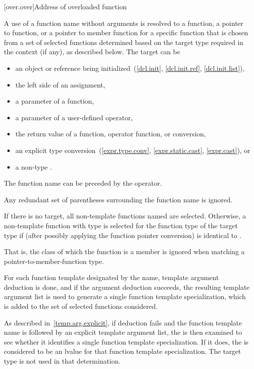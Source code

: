 %

[over.over]{Address of overloaded function}%
%

\pnum
A use of a function name without arguments is resolved to
a function, a pointer to function, or a pointer to member function
for a specific function
that is chosen from a set of selected functions
determined based on the target type required in the context (if any),
as described below.
The target can be
\begin{itemize}
\item
an object or reference being initialized~(\ref{dcl.init}, \ref{dcl.init.ref},
\ref{dcl.init.list}),
\item
the left side of an assignment,
\item
a parameter of a function,
\item
a parameter of a user-defined operator,
\item
the return value of a function, operator function, or conversion,
\item
an explicit type conversion~(\ref{expr.type.conv}, \ref{expr.static.cast},
\ref{expr.cast}), or
\item
a non-type
.
\end{itemize}
The function name can be preceded by the \tcode{\&} operator.
\begin{note}
Any redundant set of parentheses surrounding the function name is
ignored.
\end{note}

\pnum
If there is no target, all non-template functions named are selected.
Otherwise, a non-template function with type 
is selected for the function type  of the target type
if 
(after possibly applying the function pointer conversion)
is identical to .
\begin{note}
That is, the class of which the function is a member is ignored when matching a
pointer-to-member-function type.
\end{note}

\pnum
For each function template designated by the name,
template argument deduction is done, and
if the argument deduction succeeds,
the
resulting template argument list is
used to generate a single
function template specialization,
which is added to the set of selected functions
considered.
\begin{note}
As described in~\ref{temp.arg.explicit}, if deduction fails and the
function template name is followed by an explicit template argument list,
the
is then examined to see whether it identifies a single function template
specialization. If it does, the
is considered to be an lvalue for that function template specialization.
The target type is not used in that determination.
\end{note}


